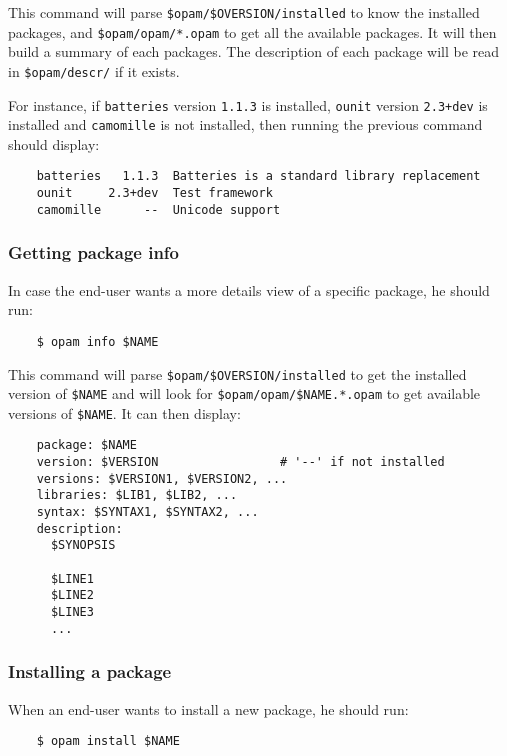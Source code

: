 \documentclass[a4paper,11pt]{article}
\begin{document}
This command will parse \verb+$opam/$OVERSION/installed+ to know the
installed packages, and \verb+$opam/opam/*.opam+ to get all the
available packages. It will then build a summary of each packages. The
description of each package will be read in \verb+$opam/descr/+ if it
exists.

For instance, if {\tt batteries} version {\tt 1.1.3} is installed,
{\tt ounit} version {\tt 2.3+dev} is installed and {\tt camomille} is
not installed, then running the previous command should display:

\begin{verbatim}
    batteries   1.1.3  Batteries is a standard library replacement
    ounit     2.3+dev  Test framework
    camomille      --  Unicode support
\end{verbatim}

\subsubsection{Getting package info}

In case the end-user wants a more details view of a specific package,
he should run:

\begin{verbatim}
    $ opam info $NAME
\end{verbatim}

This command will parse \verb+$opam/$OVERSION/installed+ to get the
installed version of \verb+$NAME+ and will look for
\verb+$opam/opam/$NAME.*.opam+ to get available versions of
\verb+$NAME+. It can then display:

\begin{verbatim}
    package: $NAME
    version: $VERSION                 # '--' if not installed
    versions: $VERSION1, $VERSION2, ...
    libraries: $LIB1, $LIB2, ...
    syntax: $SYNTAX1, $SYNTAX2, ...
    description:
      $SYNOPSIS

      $LINE1
      $LINE2
      $LINE3
      ...
\end{verbatim}

\subsubsection{Installing a package}
\label{opam-install}

When an end-user wants to install a new package, he should run:

\begin{verbatim}
    $ opam install $NAME
\end{verbatim}
\end{document}
